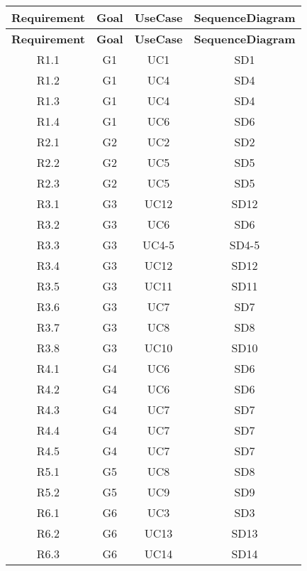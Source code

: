 \begin{longtable}{cccc}
    
    \toprule
    \textbf{Requirement} & \textbf{Goal} & \textbf{UseCase} & \textbf{SequenceDiagram} \\
    \midrule
    \endfirsthead
    
    \toprule
    \textbf{Requirement} & \textbf{Goal} & \textbf{UseCase} & \textbf{SequenceDiagram} \\
    \midrule
    \endhead
    
    \bottomrule
    \endfoot
    
    R1.1 & G1 & UC1    & SD1  \\
    R1.2 & G1 & UC4    & SD4  \\
    R1.3 & G1 & UC4    & SD4  \\
    R1.4 & G1 & UC6  & SD6 \\
    R2.1 & G2 & UC2    & SD2  \\
    R2.2 & G2 & UC5    & SD5  \\
    R2.3 & G2 & UC5  & SD5 \\
    R3.1 & G3 & UC12  & SD12 \\
    R3.2 & G3 & UC6 & SD6 \\
    R3.3 & G3 & UC4-5  & SD4-5 \\
    R3.4 & G3 & UC12  & SD12 \\
    R3.5 & G3 & UC11  & SD11 \\
    R3.6 & G3 & UC7   & SD7  \\
    R3.7 & G3 & UC8    & SD8  \\
    R3.8 & G3 & UC10    & SD10  \\
    R4.1 & G4 & UC6  & SD6 \\
    R4.2 & G4 & UC6 & SD6 \\
    R4.3 & G4 & UC7  & SD7 \\
    R4.4 & G4 & UC7  & SD7 \\
    R4.5 & G4 & UC7  & SD7 \\
    R5.1 & G5 & UC8    & SD8  \\
    R5.2 & G5 & UC9    & SD9  \\
    R6.1 & G6 & UC3    & SD3  \\
    R6.2 & G6 & UC13  & SD13 \\
    R6.3 & G6 & UC14 & SD14 \\


\end{longtable}

\newpage


